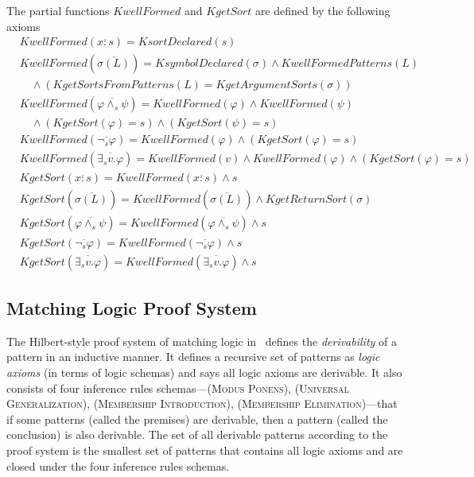 \documentclass[UTF8,11pt]{article}
\theoremstyle{plain}
\theoremstyle{definition}
\theoremstyle{remark}
\newcommand{\cln}{{:}}
\newcommand{\KgetArgumentSorts}{\mathit{KgetArgumentSorts}}
\newcommand{\KgetReturnSort}{\mathit{KgetReturnSort}}
\newcommand{\KsortDeclared}{\mathit{KsortDeclared}}
\newcommand{\KsymbolDeclared}{\mathit{KsymbolDeclared}}
\newcommand{\KwellFormed}{\mathit{KwellFormed}}
\newcommand{\KwellFormedPatterns}{\mathit{KwellFormedPatterns}}
\newcommand{\KgetSort}{\mathit{KgetSort}}
\newcommand{\KgetSortsFromPatterns}{\mathit{KgetSortsFromPatterns}}
\begin{document}
The partial functions $\KwellFormed$ and $\KgetSort$ are defined by the following axioms
\begin{align*}
  &\KwellFormed(\overline{x \cln s}) = \KsortDeclared(s)
  \\
  & \KwellFormed(\overline{\sigma(L)}) 
  = \KsymbolDeclared(\sigma) 
  \wedge \KwellFormedPatterns(L)
  \\
  & \quad \wedge (\KgetSortsFromPatterns(L) = \KgetArgumentSorts(\sigma))
  \\
  & \KwellFormed(\overline{\varphi \wedge_s \psi}) 
  = \KwellFormed(\varphi) \wedge \KwellFormed(\psi)
  \\
  & \quad \wedge (\KgetSort(\varphi) = s) \wedge (\KgetSort(\psi) = s)
  \\
  & \KwellFormed(\overline{\neg_s \varphi}) = \KwellFormed(\varphi)
    \wedge (\KgetSort(\varphi) = s)
  \\
  & \KwellFormed(\overline{\exists_s v . \varphi}) =
  \KwellFormed(v) \wedge \KwellFormed(\varphi) \wedge (\KgetSort(\varphi) = s)
  \\
  & \KgetSort(\overline{x \cln s}) = \KwellFormed(\overline{x \cln s}) \wedge s
  \\
  & \KgetSort(\overline{\sigma(L)}) = \KwellFormed(\overline{\sigma(L)}) \wedge 
  \KgetReturnSort(\sigma)
  \\
  & \KgetSort(\overline{\varphi \wedge_s \psi}) = 
  \KwellFormed(\overline{\varphi \wedge_s \psi}) \wedge s
  \\
  & \KgetSort(\overline{\neg_s \varphi}) = \KwellFormed(\overline{\neg_s 
  \varphi}) \wedge s
  \\
  & \KgetSort(\overline{\exists_s v . \varphi}) = 
  \KwellFormed(\overline{\exists_s v . \varphi}) \wedge s
\end{align*}

\subsection{Matching Logic Proof System}
\label{sec:ml-proof-system-finite-case}

The Hilbert-style proof system of matching logic in~\cite{rosu-2017-lmcs} 
defines the \emph{derivability} of a pattern in an inductive manner.
It defines a recursive set of patterns as \emph{logic axioms} (in terms of 
logic 
schemas) and 
says 
all logic axioms are derivable.
It also consists of four inference rules schemas---\textsc{(Modus Ponens)}, 
\textsc{(Universal Generalization)}, \textsc{(Membership Introduction)}, 
\textsc{(Membership Elimination)}---that if some patterns (called the premises) 
are derivable, then a pattern (called the conclusion) is also derivable.
The set of all derivable patterns according to the proof system is the smallest 
set of patterns that contains all logic axioms and are closed under the four 
inference rules schemas.
\end{document}
